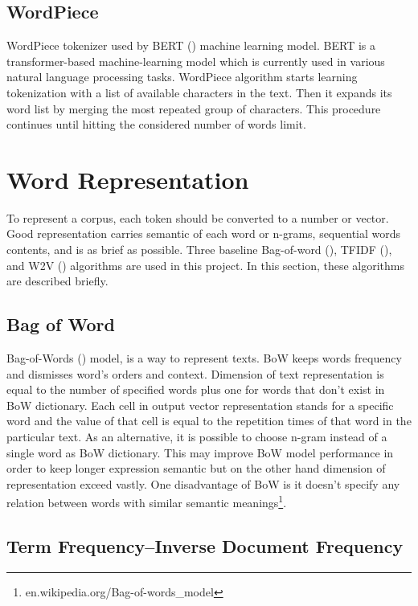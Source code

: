 \subsection{WordPiece}
WordPiece tokenizer used by \ac{BERT} (\cite{bert}) machine learning model. \ac{BERT} is a transformer-based machine-learning model which is currently used in various natural language processing tasks. WordPiece algorithm starts learning tokenization with a list of available characters in the text. Then it expands its word list by merging the most repeated group of characters. This procedure continues until hitting the considered number of words limit. 

\section{Word Representation}
\label{lr:wordrep}
To represent a corpus, each token should be converted to a number or vector. Good representation carries semantic of each word or n-grams, sequential words contents, and is as brief as possible. Three baseline Bag-of-word (\cite{bow}), \ac{TFIDF} (\cite{tfidf}), and \ac{W2V} (\cite{word2vec}) algorithms are used in this project. In	 this section, these algorithms are described briefly.
\subsection{Bag of Word}
Bag-of-Words (\cite{bow}) model, is a way to represent texts. \ac{BoW} keeps words frequency and dismisses word's orders and context. Dimension of text representation is equal to the number of specified words plus one for words that don't exist in \ac{BoW} dictionary. Each cell in output vector representation stands for a specific word and the value of that cell is equal to the repetition times of that word in the particular text. As an alternative, it is possible to choose n-gram instead of a single word as \ac{BoW} dictionary. This may improve \ac{BoW} model performance in order to keep longer expression semantic but on the other hand dimension of representation exceed vastly. One disadvantage of \ac{BoW} is it doesn't specify any relation between words with similar semantic meanings\footnote{en.wikipedia.org/Bag-of-words\_model}. 

\subsection{Term Frequency–Inverse Document Frequency}

